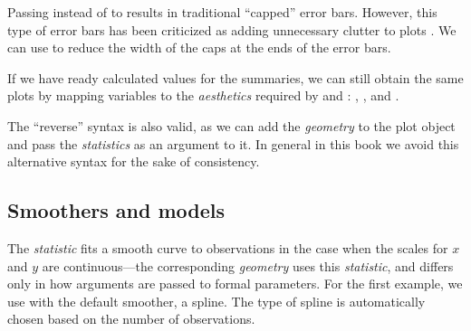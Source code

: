 \documentclass[krantz2]{krantz}\usepackage{knitr}%
\begin{document}
\begin{knitrout}\footnotesize
{}\color{fgcolor}\begin{kframe}
\begin{alltt}
  \hlstd{(} \hlstd{=} \hlstd{,}  \hlstd{=} \hlstd{,}
                \hlstd{=} \hlstd{,}  \hlstd{=} \hlstd{)}
\end{alltt}
\end{kframe}
\end{knitrout}

Passing  instead of  to  results in traditional ``capped'' error bars. However, this type of error bars has been criticized as adding unnecessary clutter to plots \autocite{Tufte1983}. We can use  to reduce the width of the caps at the ends of the error bars.

If we have ready calculated values for the summaries, we can still obtain the same plots by mapping variables to the \emph{aesthetics} required by  and : , ,  and .

\begin{explainbox}
The ``reverse'' syntax is also valid, as we can add the \emph{geometry} to the plot object and pass the \emph{statistics} as an argument to it. In general in this book we avoid this alternative syntax for the sake of consistency.

\begin{knitrout}\footnotesize
{}\color{fgcolor}\begin{kframe}
\begin{alltt}
  \hlopt{+}
  \hlstd{(} \hlstd{=} \hlstd{,}  
\end{alltt}
\end{kframe}
\end{knitrout}
\end{explainbox}

\subsection{Smoothers and models}
The \emph{statistic}  fits a smooth curve to observations in the case when the scales for $x$ and $y$ are continuous---the corresponding \emph{geometry}  uses this \emph{statistic}, and differs only in how arguments are passed to formal parameters. For the first example, we use  with the default smoother, a spline. The type of spline is automatically chosen based on the number of observations.
\end{document}
